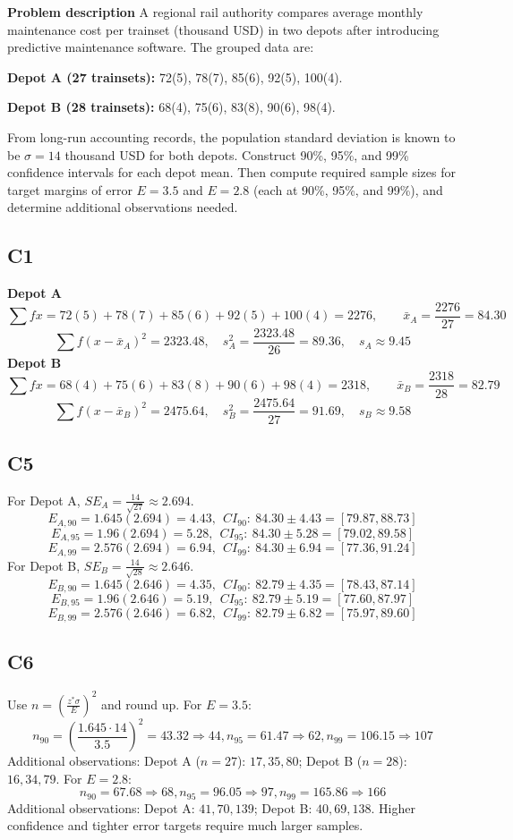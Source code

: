 	\begin{ExamProblems}
		\newpage
		\item
		\textbf{Problem description}
		A regional rail authority compares average monthly maintenance cost per trainset (thousand USD) in two depots after introducing predictive maintenance software.
		The grouped data are:
		
		\textbf{Depot A (27 trainsets):} 72(5), 78(7), 85(6), 92(5), 100(4).
		
		\textbf{Depot B (28 trainsets):} 68(4), 75(6), 83(8), 90(6), 98(4).
		
		From long-run accounting records, the population standard deviation is known to be $\sigma = 14$ thousand USD for both depots.
		Construct 90\%, 95\%, and 99\% confidence intervals for each depot mean.
		Then compute required sample sizes for target margins of error $E=3.5$ and $E=2.8$ (each at 90\%, 95\%, and 99\%), and determine additional observations needed.
		
		\subsection*{C1}
		\textbf{Depot A}
		\[
		\sum fx = 72(5)+78(7)+85(6)+92(5)+100(4)=2276,
		\qquad \bar{x}_A=\frac{2276}{27}=84.30
		\]
		\[
		\sum f(x-\bar{x}_A)^2=2323.48,
		\quad s_A^2=\frac{2323.48}{26}=89.36,
		\quad s_A\approx 9.45
		\]
		\textbf{Depot B}
		\[
		\sum fx = 68(4)+75(6)+83(8)+90(6)+98(4)=2318,
		\qquad \bar{x}_B=\frac{2318}{28}=82.79
		\]
		\[
		\sum f(x-\bar{x}_B)^2=2475.64,
		\quad s_B^2=\frac{2475.64}{27}=91.69,
		\quad s_B\approx 9.58
		\]
		
		\subsection*{C5}
		For Depot A, $SE_A=\frac{14}{\sqrt{27}}\approx2.694$.
		\[
		E_{A,90}=1.645(2.694)=4.43,\ \ CI_{90}:\ 84.30\pm4.43=[79.87,88.73]
		\]
		\[
		E_{A,95}=1.96(2.694)=5.28,\ \ CI_{95}:\ 84.30\pm5.28=[79.02,89.58]
		\]
		\[
		E_{A,99}=2.576(2.694)=6.94,\ \ CI_{99}:\ 84.30\pm6.94=[77.36,91.24]
		\]
		For Depot B, $SE_B=\frac{14}{\sqrt{28}}\approx2.646$.
		\[
		E_{B,90}=1.645(2.646)=4.35,\ \ CI_{90}:\ 82.79\pm4.35=[78.43,87.14]
		\]
		\[
		E_{B,95}=1.96(2.646)=5.19,\ \ CI_{95}:\ 82.79\pm5.19=[77.60,87.97]
		\]
		\[
		E_{B,99}=2.576(2.646)=6.82,\ \ CI_{99}:\ 82.79\pm6.82=[75.97,89.60]
		\]
		
		\subsection*{C6}
		Use $n=\left(\frac{z^*\sigma}{E}\right)^2$ and round up.
		For $E=3.5$:
		\[
		n_{90}=\left(\frac{1.645\cdot14}{3.5}\right)^2=43.32\Rightarrow44,
		n_{95}=61.47\Rightarrow62,
		n_{99}=106.15\Rightarrow107
		\]
		Additional observations:
		Depot A ($n=27$): $17,35,80$; Depot B ($n=28$): $16,34,79$.
		For $E=2.8$:
		\[
		n_{90}=67.68\Rightarrow68,
		n_{95}=96.05\Rightarrow97,
		n_{99}=165.86\Rightarrow166
		\]
		Additional observations:
		Depot A: $41,70,139$; Depot B: $40,69,138$.
		Higher confidence and tighter error targets require much larger samples.


\end{ExamProblems}
